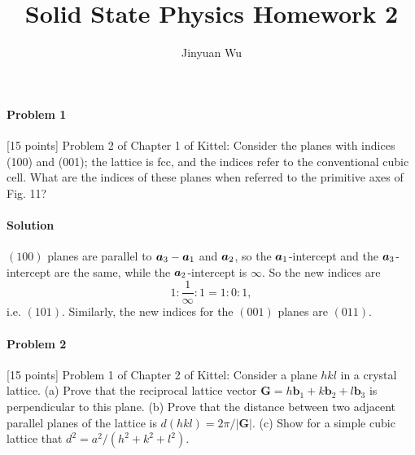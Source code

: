 \documentclass[hyperref, a4paper]{article}
\title{Solid State Physics Homework 2}
\author{Jinyuan Wu}
\begin{document}
\maketitle

\paragraph{Problem 1} [15 points] Problem 2 of Chapter 1 of Kittel:
Consider the planes with indices (100) and (001); the lattice is fcc, and the indices refer to the conventional cubic cell. What are the indices of these planes when referred to the primitive axes of Fig. 11?

\paragraph{Solution} $(100)$ planes are parallel to $\vb*{a}_3 - \vb*{a}_1$ and $\vb*{a}_2$,
so the $\vb*{a}_1$-intercept and the $\vb*{a}_3$-intercept are the same,
while the $\vb*{a}_2$-intercept is $\infty$.
So the new indices are 
\[
    1 : \frac{1}{\infty} : 1 = 1 : 0 : 1,
\]
i.e. $(101)$. Similarly, the new indices for the $(001)$ planes are $(011)$.

\paragraph{Problem 2} [15 points] Problem 1 of Chapter 2 of Kittel:
Consider a plane $h k l$ in a crystal lattice. (a) Prove that the reciprocal lattice vector $\mathbf{G}=h \mathbf{b}_1+k \mathbf{b}_2+l \mathbf{b}_3$ is perpendicular to this plane. (b) Prove that the distance between two adjacent parallel planes of the lattice is $d(h k l)=2 \pi /|\mathbf{G}|$. (c) Show for a simple cubic lattice that $d^2=a^2 /\left(h^2+k^2+l^2\right)$.
\end{document}
